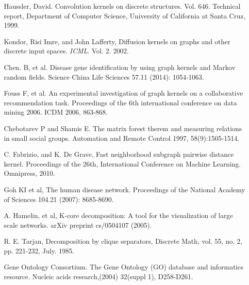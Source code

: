 \documentclass{esannV2}
\begin{document}
\begin{footnotesize}

\begin{thebibliography}{99}

 Haussler, David. Convolution kernels on discrete structures. Vol. 646. Technical report, Department of Computer Science, University of California at Santa Cruz, 1999.

 Kondor, Risi Imre, and John Lafferty, Diffusion kernels on graphs and other discrete input spaces. \emph{ICML}. Vol. 2. 2002.

 Chen. B, et al. Disease gene identification by using graph kernels and Markov random fields. Science China Life Sciences 57.11 (2014): 1054-1063.

 Fouss F, et al. An experimental investigation of graph kernels on a collaborative recommendation task. Proceedings of the 6th international conference on data mining 2006. ICDM 2006, 863-868.

 Chebotarev P and Shamis E. The matrix forest therem and measuring relations in small social groups. Automation and Remote Control 1997, 58(9):1505-1514.

 C. Fabrizio, and K. De Grave, Fast neighborhood subgraph pairwise distance kernel. Proceedings of the 26th, International Conference on Machine Learning. Omnipress, 2010.

 Goh KI et al, The human disease network. Proceedings of the National Academy of Sciences 104.21 (2007): 8685-8690.

 A. Hamelin, et al, K-core decomposition: A tool for the visualization of large scale networks. arXiv preprint cs/0504107 (2005).

 R. E. Tarjan, Decomposition by clique separators, Discrete Math, vol. 55, no. 2, pp. 221-232, July. 1985.

 Gene Ontology Consortium. The Gene Ontology (GO) database and informatics resource.
Nucleic acids research,(2004) 32(suppl 1), D258-D261.

\end{thebibliography}


%
%

\end{footnotesize}

\end{document}
